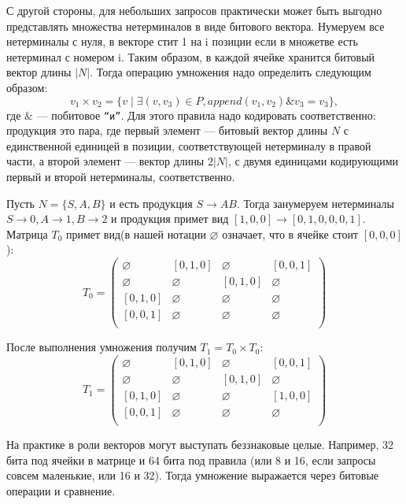С другой стороны, для небольших запросов практически может быть выгодно представлять множества нетерминалов в виде битового вектора.
Нумеруем все нетерминалы с нуля, в векторе стит 1 на i позиции если в множетве есть нетерминал с номером i.
Таким образом, в каждой ячейке хранится битовый вектор длины $|N|$.
Тогда операцию умножения надо определить следующим образом:
$$v_1 \times v_2 = \{v \mid \exists (v,v_3) \in P, \textit{append}(v_1, v_2) \& v_3 = v_3\},$$ где $\&$ --- побитовое \texttt{``и''}.
Для этого правила надо кодировать соответственно: продукция это пара, где первый элемент --- битовый вектор длины $N$ с единственной единицей в позиции, соответствующей нетерминалу в правой части, а второй элемент --- вектор длины $2|N|$, с двумя единицами кодирующими первый и второй нетерминалы, соответственно.

\begin{example}
Пусть $N = \{S, A, B\}$ и есть продукция $S \to A B$. Тогда занумеруем нетерминалы $ S \to 0, A \to 1, B \to 2$ и продукция примет вид $[1, 0, 0] \to [0, 1, 0, 0, 0, 1]$. Матрица $T_0$ примет вид(в нашей нотации $\varnothing$ означает, что в ячейке стоит $[0,0,0]$):
\[
T_0 = \begin{pmatrix}
\varnothing & [0,1,0]       & \varnothing & [0,0,1]       \\
\varnothing & \varnothing & [0,1,0]       & \varnothing \\
[0,1,0]       & \varnothing & \varnothing & \varnothing \\
[0,0,1]      & \varnothing & \varnothing & \varnothing \\
\end{pmatrix}
\]

После выполнения умножения получим $T_1 = T_0 \times T_0$:
\[
T_1 = \begin{pmatrix}
\varnothing & [0,1,0]       & \varnothing & [0,0,1]       \\
\varnothing & \varnothing & [0,1,0]       & \varnothing \\
[0,1,0]       & \varnothing & \varnothing & [1,0,0] \\
[0,0,1]      & \varnothing & \varnothing & \varnothing \\
\end{pmatrix}
\]
\end{example}


На практике в роли векторов могут выступать беззнаковые целые. 
Например, 32 бита под ячейки в матрице и 64 бита под правила (или 8 и 16, если запросы совсем маленькие, или 16 и 32).
Тогда умножение выражается через битовые операции и сравнение.



